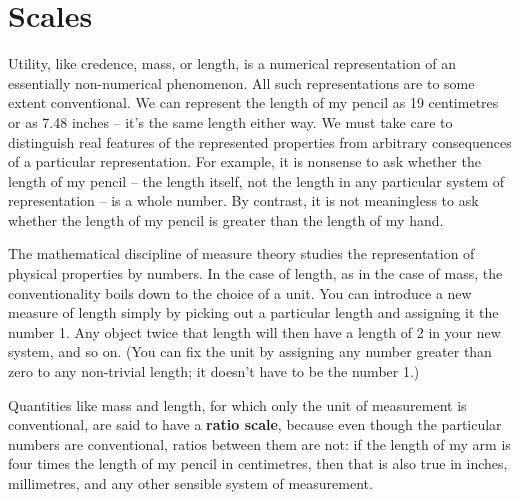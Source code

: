 \section{Scales}

Utility, like credence, mass, or length, is a numerical representation
of an essentially non-numerical phenomenon. All such representations
are to some extent conventional.  We can represent the length of my
pencil as 19 centimetres or as 7.48 inches -- it's the same length
either way. We must take care to distinguish real features of the
represented properties from arbitrary consequences of a particular
representation. For example, it is nonsense to ask whether the length
of my pencil -- the length itself, not the length in any particular
system of representation -- is a whole number. By contrast, it is not
meaningless to ask whether the length of my pencil is greater than the
length of my hand.

The mathematical discipline of measure theory studies the
representation of physical properties by numbers. In the case of
length, as in the case of mass, the conventionality boils down to the
choice of a unit. You can introduce a new measure of length simply by
picking out a particular length and assigning it the number 1. Any
object twice that length will then have a length of 2 in your new
system, and so on. (You can fix the unit by assigning any number
greater than zero to any non-trivial length; it doesn't have to be the
number 1.)

Quantities like mass and length, for which only the unit of
measurement is conventional, are said to have a \textbf{ratio scale},
because even though the particular numbers are conventional, ratios
between them are not: if the length of my arm is four times the length
of my pencil in centimetres, then that is also true in inches,
millimetres, and any other sensible system of measurement.

